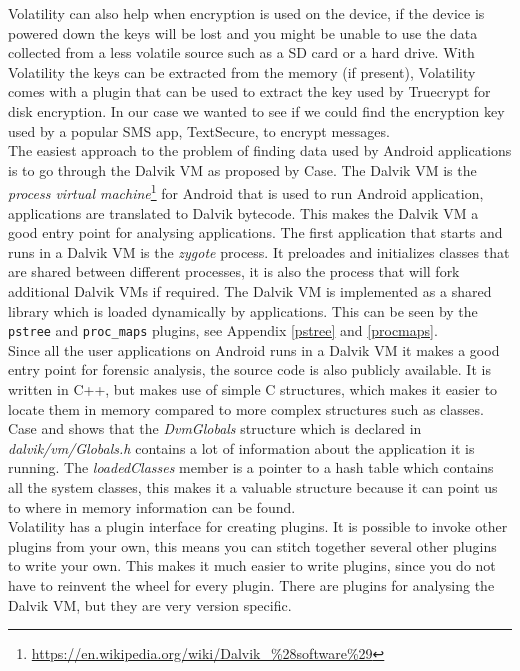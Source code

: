   Volatility can also help when encryption is used on the device, if the device is
  powered down the keys will be lost and you might be unable to use the data 
  collected from a less volatile source such as a SD card or a hard drive. With
  Volatility the keys can be extracted from the memory (if present), Volatility 
  comes with a plugin that can be used to extract the key used by Truecrypt for 
  disk encryption. In our case we wanted to see if we could find the encryption
  key used by a popular SMS app, TextSecure, to encrypt messages.\\
  
  The easiest approach to the problem of finding data used by Android
  applications is to go through the Dalvik VM as proposed by Case\cite{case2011}.
  The Dalvik VM is the \textit{process virtual
  machine}\footnote{\url{https://en.wikipedia.org/wiki/Dalvik\_\%28software\%29}} for
  Android that is used to run Android application, applications are translated to
  Dalvik bytecode. This makes the Dalvik VM a good entry point for analysing
  applications. The first application that starts and runs in a Dalvik VM is the
  \textit{zygote} process. It preloades and initializes classes that are shared
  between different processes, it is also the process that will fork additional
  Dalvik VMs if required. The Dalvik VM is implemented as a shared library which
  is loaded dynamically by applications. This can be seen by the \texttt{pstree} and
  \texttt{proc\_maps} plugins, see Appendix \ref{pstree} and \ref{procmaps}. \\

  Since all the user applications on Android runs in a Dalvik VM it makes a good entry
  point for forensic analysis, the source code is also publicly available. It is
  written in C++, but makes use of simple C structures, which makes it easier to
  locate them in memory compared to more complex structures such as classes. Case
  and \cite{holger} shows that the \textit{DvmGlobals} structure which is
  declared in \textit{dalvik/vm/Globals.h} contains a lot of information about
  the application it is running. The \textit{loadedClasses} member is a pointer
  to a hash table which contains all the system classes, this makes it a
  valuable structure because it can point us to where in memory information can
  be found.\\

  Volatility has a plugin interface for creating plugins. It is possible to
  invoke other plugins from your own, this means you can stitch together
  several other plugins to write your own. This makes it much easier to write
  plugins, since you do not have to reinvent the wheel for every plugin. There
  are plugins for analysing the Dalvik VM, but they are very version specific.

